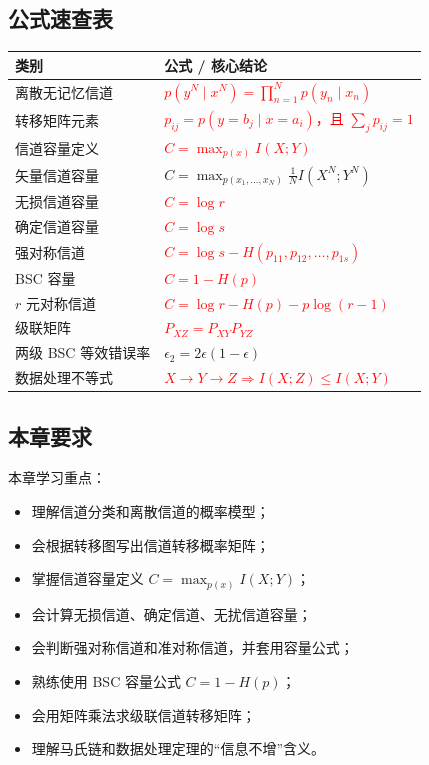 \subsection{公式速查表}

{\scriptsize
\begin{tabularx}{\textwidth}{@{}l>{\raggedright\arraybackslash}X@{}}
\toprule
\textbf{类别} & \textbf{公式 / 核心结论} \\
\midrule
离散无记忆信道 & \textcolor{Red}{$p(y^N\mid x^N)=\prod_{n=1}^{N}p(y_n\mid x_n)$} \\
\midrule
转移矩阵元素 & \textcolor{Red}{$p_{ij}=p(y=b_j\mid x=a_i)$，且 $\sum_jp_{ij}=1$} \\
\midrule
信道容量定义 & \textcolor{Red}{$C=\max_{p(x)}I(X;Y)$} \\
\midrule
矢量信道容量 & $C=\max_{p(x_1,\dots,x_N)}\frac1N I(X^N;Y^N)$ \\
\midrule
无损信道容量 & \textcolor{Red}{$C=\log r$} \\
\midrule
确定信道容量 & \textcolor{Red}{$C=\log s$} \\
\midrule
强对称信道 & \textcolor{Red}{$C=\log s-H(p_{11},p_{12},\dots,p_{1s})$} \\
\midrule
BSC 容量 & \textcolor{Red}{$C=1-H(p)$} \\
\midrule
$r$ 元对称信道 & \textcolor{Red}{$C=\log r-H(p)-p\log(r-1)$} \\
\midrule
级联矩阵 & \textcolor{Red}{$P_{XZ}=P_{XY}P_{YZ}$} \\
\midrule
两级 BSC 等效错误率 & $\epsilon_2=2\epsilon(1-\epsilon)$ \\
\midrule
数据处理不等式 & \textcolor{Red}{$X\to Y\to Z\Rightarrow I(X;Z)\le I(X;Y)$} \\
\bottomrule
\end{tabularx}
}

\subsection{本章要求}
本章学习重点：
\begin{itemize}
  \item 理解信道分类和离散信道的概率模型；
  \item 会根据转移图写出信道转移概率矩阵；
  \item 掌握信道容量定义 $C=\max_{p(x)}I(X;Y)$；
  \item 会计算无损信道、确定信道、无扰信道容量；
  \item 会判断强对称信道和准对称信道，并套用容量公式；
  \item 熟练使用 BSC 容量公式 $C=1-H(p)$；
  \item 会用矩阵乘法求级联信道转移矩阵；
  \item 理解马氏链和数据处理定理的“信息不增”含义。
\end{itemize}
